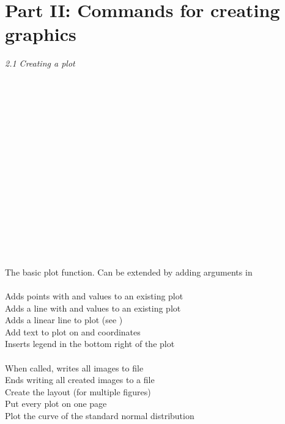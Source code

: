 \label{rhelpparttwo}

\section{Part II: Commands for creating graphics}

\textit{2.1 Creating a plot} \\
\\
\begin{minipage}[t]{.4\textwidth}
\vspace*{-8pt}
 \\
\\
\\
 \\
 \\
 \\
 \\
 \\
\\
 \\		
 \\
 \\
 \\
 \\
\end{minipage}
\begin{minipage}[t]{.6\textwidth}
The basic plot function. Can be extended by adding arguments in  \\
\\
Adds points with  and  values to an existing plot \\
Adds a line with  and  values to an existing plot \\
Adds a linear line to plot (see ) \\
Add text to plot on  and  coordinates \\
Inserts legend in the bottom right of the plot \\
\\
When called, writes all images to  file  \\
Ends writing all created images to a file  \\
Create the layout (for multiple figures) \\
Put every plot on one page \\
Plot the curve of the standard normal distribution
\end{minipage}
\vspace*{.5cm}

